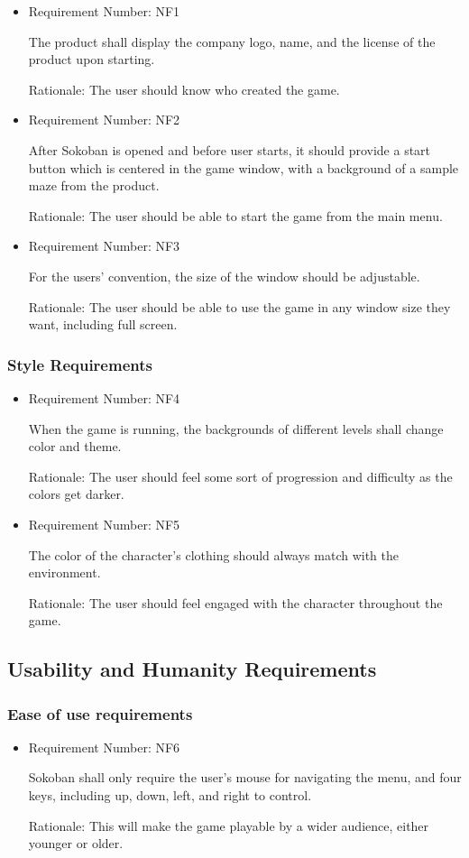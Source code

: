 \documentclass[12pt, titlepage]{article}
\begin{document}
\begin{itemize}
    \item Requirement Number: NF1
    
The product shall display the company logo, name, and the license of the product upon starting.

Rationale: The user should know who created the game.
    \item Requirement Number: NF2
    
After Sokoban is opened and before user starts, it should provide a start button which is centered in the game window, with a background of a sample maze from the product.

Rationale: The user should be able to start the game from the main menu.
    \item Requirement Number: NF3
    
For the users' convention, the size of the window should be adjustable.

Rationale: The user should be able to use the game in any window size they want, including full screen.
\end{itemize}

\subsubsection{Style Requirements}
\begin{itemize}
    \item Requirement Number: NF4
    
When the game is running, the backgrounds of different levels shall change color and theme.

Rationale: The user should feel some sort of progression and difficulty as the colors get darker.
    \item Requirement Number: NF5
    
     The color of the character's clothing should always match with the environment.
     
    Rationale: The user should feel engaged with the character throughout the game.
\end{itemize}


\subsection{Usability and Humanity Requirements}
\subsubsection{Ease of use requirements}
\begin{itemize}
        \item Requirement Number: NF6

Sokoban shall only require the user's mouse for navigating the menu, and four keys, including up, down, left, and right to control.
     
    Rationale: This will make the game playable by a wider audience, either younger or older.
\end{itemize}
\end{document}
